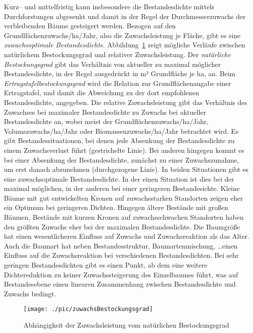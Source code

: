 \documentclass[twocolumn]{scrartcl}
\begin{document}
Kurz-- und mittelfristig kann insbesondere die Bestandesdichte mittels
Durchforstungen abgesenkt und damit in der Regel der Durchmesserzuwachs der
verbleibenden Bäume gesteigert werden. Bezogen auf den
Grundlfächenzuwachs/ha/Jahr, also die Zuwachsleistung je Fläche, gibt es eine
\emph{zuwachsoptimale Bestandesdichte}.
Abbildung~\ref{fig:zuwachsBestockungsgrad} zeigt mögliche Verläufe zwischen
natürlichem Bestockungsgrad und relativer Zuwachsleistung. Der \emph{natürliche
Bestockungsgrad} gibt das Verhältnis von
aktueller zu maximal möglicher Bestandesdichte, in der Regel ausgedrückt in m²
Grundfläche je ha, an. Beim
\emph{Ertragstafelbestockungsgrad} wird
die Relation zur Grundflächenangabe einer Ertragstafel, und damit die Abweichung
zu der dort empfohlenen Bestandesdichte, angegeben. Die relative Zuwachsleistung
gibt das Verhältnis des Zuwachses bei maximaler Bestandesdichte zu Zuwachs bei
aktueller Bestandesdichte an, wobei meist der Grundflächenzuwachs/ha/Jahr,
Volumszuwachs/ha/Jahr oder Biomassenzuwachs/ha/Jahr betrachtet wird. Es gibt
Bestandessituationen, bei denen jede Absenkung der Bestandesdichte zu einem
Zuwachsverlust führt (gestrichelte Linie). Bei anderen hingegen kommt es bei
einer Absenkung der Bestandesdichte, zunächst zu einer Zuwachszunahme, um erst
danach abzunehmen (durchgezogene Linie). In beiden Situationen gibt es eine
zuwachsoptimale Bestandesdichte. In der einen Situation ist dies bei der maximal
möglichen, in der anderen bei einer geringeren Bestandesichte. Kleine Bäume mit
gut entwickelten Kronen auf zuwachsstarken Standorten zeigen eher ein Optimum
bei geringeren Dichten. Hingegen ältere Bestände mit großen Bäumen, Bestände mit
kurzen Kronen auf zuwachsschwachen Standorten haben den größten Zuwachs eher bei
der maximalen Bestandesdichte. Die Baumgröße hat einen wesentlicheren Einfluss
auf Zuwachs und Zuwachsreaktion als das Alter. Auch die Baumart hat neben
Bestandesstruktur, Baumartenmischung, \dots einen Einfluss auf die
Zuwachsreaktion bei verschiedenen Bestandesdichten. Bei sehr geringen
Bestandesdichten gibt es einen Punkt, ab dem eine weitere Dichtereduktion zu
keiner Zuwachssteigerung des Einzelbaumes führt, was auf Bestandesebene einen
linearen Zusammenhang zwischen Bestandesdichte und Zuwachs bedingt.

\begin{figure}[htbp]
  \centering
  \texttt{[image: ./pic/zuwachsBestockungsgrad]}
  \caption{Abhängigkeit der Zuwachsleistung vom natürlichen Bestockungsgrad}
  \label{fig:zuwachsBestockungsgrad}
\end{figure}
\end{document}
